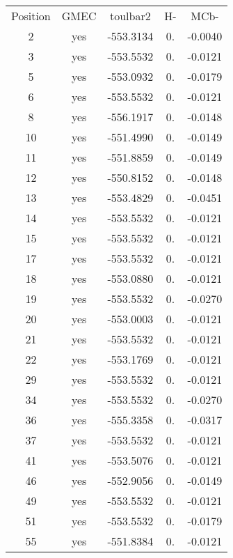     \begin{table}[h]
      \centering

      \begin{tabular}{ccccc}


        \toprule
        Position & GMEC & toulbar2 & H- & MCb- \\
        \cmidrule{1-5}
        2  & yes &  -553.3134 &  0. & -0.0040 \\
        3  & yes &  -553.5532 &  0. & -0.0121 \\
        5  & yes &  -553.0932 &  0. & -0.0179 \\
        6  & yes &  -553.5532 &  0. & -0.0121 \\
        8  & yes &  -556.1917 &  0. & -0.0148 \\
        10 & yes &  -551.4990 &  0. & -0.0149 \\
        11 & yes &  -551.8859 &  0. & -0.0149 \\
        12 & yes &  -550.8152 &  0. & -0.0148 \\
        13 & yes &  -553.4829 &  0. & -0.0451 \\
        14 & yes &  -553.5532 &  0. & -0.0121 \\
        15 & yes &  -553.5532 &  0. & -0.0121 \\
        17 & yes &  -553.5532 &  0. & -0.0121 \\
        18 & yes &  -553.0880 &  0. & -0.0121 \\
        19 & yes &  -553.5532 &  0. & -0.0270 \\
        20 & yes &  -553.0003 &  0. & -0.0121 \\
        21 & yes &  -553.5532 &  0. & -0.0121 \\
        22 & yes &  -553.1769 &  0. & -0.0121 \\
        29 & yes &  -553.5532 &  0. & -0.0121 \\
        34 & yes &  -553.5532 &  0. & -0.0270 \\
        36 & yes &  -555.3358 &  0. & -0.0317 \\
        37 & yes &  -553.5532 &  0. & -0.0121 \\
        41 & yes &  -553.5076 &  0. & -0.0121 \\
        46 & yes &  -552.9056 &  0. & -0.0149 \\
        49 & yes &  -553.5532 &  0. & -0.0121 \\
        51 & yes &  -553.5532 &  0. & -0.0179 \\
        55 & yes &  -551.8384 &  0. & -0.0121 \\

\end{tabular}
\end{table}
